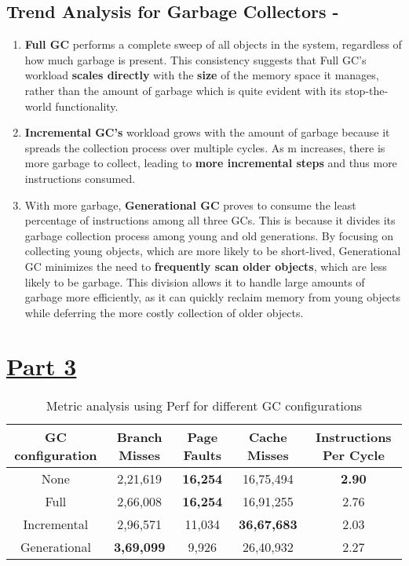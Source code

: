 \documentclass[11pt,paper=a4,answers]{exam}
\begin{document}
\subsection*{Trend Analysis for Garbage Collectors -}
\begin{enumerate}
    \item \textbf{Full GC} performs a complete sweep of all objects in the system, regardless of how much garbage is present. This consistency suggests that Full GC's workload \textbf{scales directly} with the \textbf{size} of the memory space it manages, rather than the amount of garbage which is quite evident with its stop-the-world functionality. 
    \item \textbf{Incremental GC's} workload grows with the amount of garbage because it spreads the collection process over multiple cycles. As m increases, there is more garbage to collect, leading to \textbf{more incremental steps} and thus more instructions consumed. 
    \item With more garbage, \textbf{Generational GC} proves to consume the least percentage of instructions among all three GCs. This is because it divides its garbage collection process among young and old generations. By focusing on collecting young objects, which are more likely to be short-lived, Generational GC minimizes the need to \textbf{frequently scan older objects}, which are less likely to be garbage. This division allows it to handle large amounts of garbage more efficiently, as it can quickly reclaim memory from young objects while deferring the more costly collection of older objects. 
\end{enumerate}
    
\section*{\underline{Part 3}}
\begin{table}[h!]
    \begin{center}
        \begin{tabular}{|c|c|c|c|c|}
            \hline
            \textbf{GC configuration} & \textbf{Branch Misses} & \textbf{Page Faults} & \textbf{Cache Misses} & \textbf{Instructions Per Cycle} \\
            \hline
            None & 2,21,619 & \textbf{16,254} & 16,75,494 & \textbf{2.90} \\
            \hline
            Full &  2,66,008 &  \textbf{16,254} &  16,91,255 &  2.76 \\
            \hline
            Incremental & 2,96,571 & 11,034 & \textbf{36,67,683} & 2.03 \\
            \hline
            Generational & \textbf{3,69,099} & 9,926 & 26,40,932 & 2.27 \\
            \hline
        \end{tabular}
        \caption{Metric analysis using Perf for different GC configurations}
        \label{table:3}
    \end{center}
\end{table}
\end{document}

